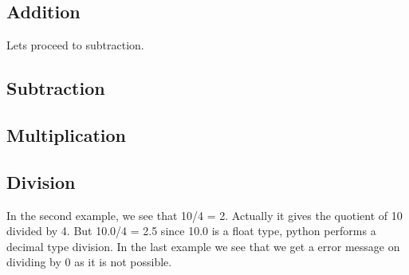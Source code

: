 \subsection{Addition}


Lets proceed to subtraction.

\subsection{Subtraction}


\subsection{Multiplication}



\subsection{Division}


In the second example, we see that 10/4 = 2. Actually it gives the quotient of 10 divided by 4.
But 10.0/4 = 2.5 since 10.0 is a {\color{cyan} float} type, python performs a decimal type division.
In the last example we see that we get a error message on dividing by 0 as it is not possible.


